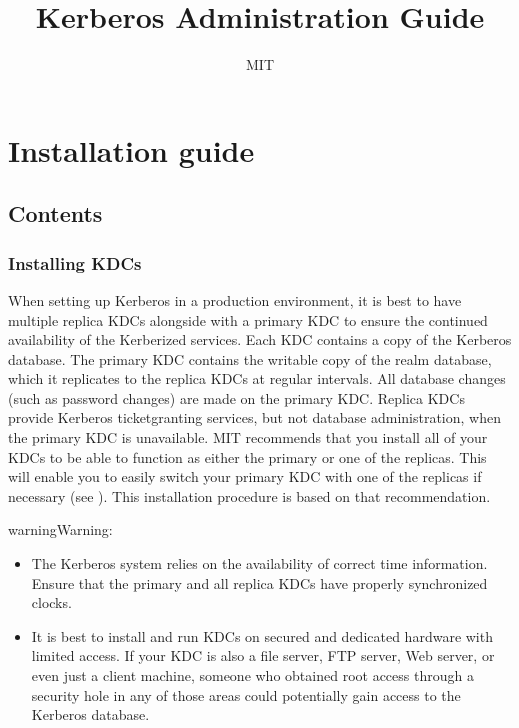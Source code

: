 \documentclass[letterpaper,10pt,english]{sphinxmanual}
\title{Kerberos Administration Guide}
\date{ }
\author{MIT}
\begin{document}
\pagestyle{empty}
\sphinxmaketitle
\pagestyle{plain}
\sphinxtableofcontents
\pagestyle{normal}
\label{\detokenize{admin/index::doc}}



\chapter{Installation guide}
\label{\detokenize{admin/install:installation-guide}}\label{\detokenize{admin/install::doc}}

\section{Contents}
\label{\detokenize{admin/install:contents}}

\subsection{Installing KDCs}
\label{\detokenize{admin/install_kdc:installing-kdcs}}\label{\detokenize{admin/install_kdc::doc}}
\sphinxAtStartPar
When setting up Kerberos in a production environment, it is best to
have multiple replica KDCs alongside with a primary KDC to ensure the
continued availability of the Kerberized services.  Each KDC contains
a copy of the Kerberos database.  The primary KDC contains the
writable copy of the realm database, which it replicates to the
replica KDCs at regular intervals.  All database changes (such as
password changes) are made on the primary KDC.  Replica KDCs provide
Kerberos ticket\sphinxhyphen{}granting services, but not database administration,
when the primary KDC is unavailable.  MIT recommends that you install
all of your KDCs to be able to function as either the primary or one
of the replicas.  This will enable you to easily switch your primary
KDC with one of the replicas if necessary (see
{\hyperref[\detokenize{admin/install_kdc:switch-primary-replica}]{}}).  This installation procedure is based
on that recommendation.

\begin{sphinxadmonition}{warning}{Warning:}\begin{itemize}
\item {} 
\sphinxAtStartPar
The Kerberos system relies on the availability of correct time
information.  Ensure that the primary and all replica KDCs have
properly synchronized clocks.

\item {} 
\sphinxAtStartPar
It is best to install and run KDCs on secured and dedicated
hardware with limited access.  If your KDC is also a file
server, FTP server, Web server, or even just a client machine,
someone who obtained root access through a security hole in any
of those areas could potentially gain access to the Kerberos
database.

\end{itemize}
\end{sphinxadmonition}
\end{document}
